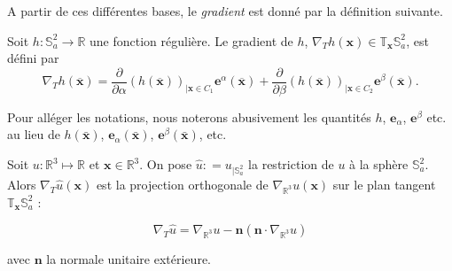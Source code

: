 A partir de ces différentes bases, le \textit{gradient} est donné par la définition suivante.

\begin{definition}
Soit $h : \mathbb{S}_a^2 \rightarrow \mathbb{R}$ une fonction régulière. Le gradient de $h$, $\nabla_T h(\mathbf{x}) \in \mathbb{T}_{\mathbf{x}}\mathbb{S}^2_a$, est défini par
\begin{equation}
\nabla_{T} h(\overline{\mathbf{x}}) = \dfrac{\partial}{\partial \alpha} \left( h(\overline{\mathbf{x}}) \right)_{| \mathbf{x} \in C_1} \mathbf{e}^{\alpha}(\overline{\mathbf{x}}) + \dfrac{\partial}{\partial \beta}\left(  h(\overline{\mathbf{x}}) \right)_{| \mathbf{x} \in C_2} \mathbf{e}^{\beta}(\overline{\mathbf{x}}).
\label{eq: gradient}
\end{equation}
\end{definition}
Pour alléger les notations, nous noterons abusivement les quantités $h$, $\mathbf{e}_{\alpha}$, $\mathbf{e}^{\beta}$ etc. au lieu de $h(\bar{\mathbf{x}})$, $\mathbf{e}_{\alpha}(\bar{\mathbf{x}})$, $\mathbf{e}^{\beta}(\bar{\mathbf{x}})$, etc.


\begin{proposition}
Soit $u: \mathbb{R}^3 \mapsto \mathbb{R}$ et $\mathbf{x} \in \mathbb{R}^3$. On pose $\hat{u} : = u_{|\mathbb{S}_a^2}$ la restriction de $u$ à la sphère $\mathbb{S}_a^2$. Alors $\nabla_{T} \hat{u} (\mathbf{x})$ est la projection orthogonale de $\nabla_{\mathbb{R}^3} u (\mathbf{x})$ sur le plan tangent $\mathbb{T}_{\mathbf{x}} \mathbb{S}_a^2$ :

\begin{equation}
\nabla_T \hat{u} = \nabla_{\mathbb{R}^3} u - \mathbf{n} \left( \mathbf{n} \cdot \nabla_{\mathbb{R}^3} u \right)
\end{equation}

avec $\mathbf{n}$ la normale unitaire extérieure.
\label{prop:gradient_project}
\end{proposition}

